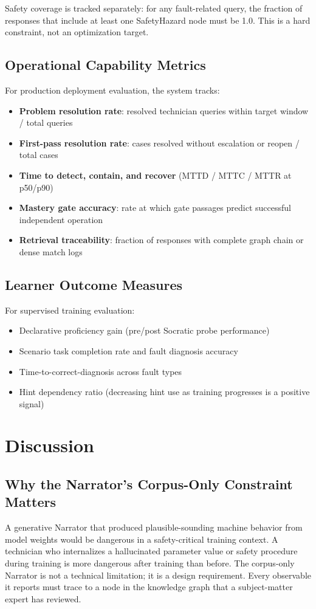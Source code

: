 \documentclass[11pt,letterpaper]{article}
\begin{document}
Safety coverage is tracked separately: for any fault-related query, the fraction of responses that include at least one SafetyHazard node must be 1.0. This is a hard constraint, not an optimization target.

\subsection{Operational Capability Metrics}
For production deployment evaluation, the system tracks:
\begin{itemize}
  \item \textbf{Problem resolution rate}: resolved technician queries within target window / total queries
  \item \textbf{First-pass resolution rate}: cases resolved without escalation or reopen / total cases
  \item \textbf{Time to detect, contain, and recover} (MTTD / MTTC / MTTR at p50/p90)
  \item \textbf{Mastery gate accuracy}: rate at which gate passages predict successful independent operation
  \item \textbf{Retrieval traceability}: fraction of responses with complete graph chain or dense match logs
\end{itemize}

\subsection{Learner Outcome Measures}
For supervised training evaluation:
\begin{itemize}
  \item Declarative proficiency gain (pre/post Socratic probe performance)
  \item Scenario task completion rate and fault diagnosis accuracy
  \item Time-to-correct-diagnosis across fault types
  \item Hint dependency ratio (decreasing hint use as training progresses is a positive signal)
\end{itemize}

\section{Discussion}
\label{sec:discussion}

\subsection{Why the Narrator's Corpus-Only Constraint Matters}
A generative Narrator that produced plausible-sounding machine behavior from model weights would be dangerous in a safety-critical training context. A technician who internalizes a hallucinated parameter value or safety procedure during training is more dangerous after training than before. The corpus-only Narrator is not a technical limitation; it is a design requirement. Every observable it reports must trace to a node in the knowledge graph that a subject-matter expert has reviewed.
\end{document}
